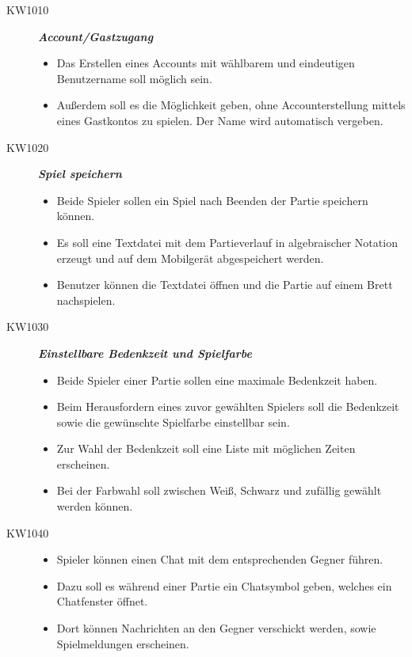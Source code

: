 \documentclass[parskip=full]{scrartcl}
\begin{document}
\begin{description}

	\item[KW1010] \textbf{\textit{Account/Gastzugang}}
	\begin{itemize}
		\item Das Erstellen eines Accounts mit wählbarem und eindeutigen Benutzername soll 		möglich sein.
		\item Außerdem soll es die Möglichkeit geben, ohne Accounterstellung mittels eines 		Gastkontos zu spielen. Der Name wird automatisch vergeben.		
	\end{itemize}
	
	\item[KW1020] \textbf{\textit{Spiel speichern}}
	\begin{itemize}
		\item Beide Spieler sollen ein Spiel nach Beenden der Partie speichern können.
		\item Es soll eine Textdatei mit dem Partieverlauf in algebraischer \gls{Notation} erzeugt und auf dem Mobilgerät abgespeichert werden.
		\item Benutzer können die Textdatei öffnen und die Partie auf einem Brett nachspielen.
	\end{itemize}
	
	\item[KW1030] \textbf{\textit{Einstellbare Bedenkzeit und Spielfarbe}}
	\begin{itemize}
		\item Beide Spieler einer Partie sollen eine maximale \gls{Bedenkzeit} haben.
		\item Beim Herausfordern eines zuvor gewählten Spielers soll die \gls{Bedenkzeit} sowie die gewünschte Spielfarbe einstellbar sein.
		\item Zur Wahl der \gls{Bedenkzeit} soll eine Liste mit möglichen Zeiten erscheinen.
		\item Bei der Farbwahl soll zwischen Weiß, Schwarz und zufällig gewählt werden können.
	\end{itemize}
	
	\item[KW1040] 
	\begin{itemize} \textbf{\textit{Chat}}
		\item \gls{Spieler} können einen Chat mit dem entsprechenden Gegner führen.
		\item Dazu soll es während einer Partie ein Chatsymbol geben, welches ein Chatfenster öffnet.
		\item Dort können Nachrichten an den Gegner verschickt werden, sowie Spielmeldungen erscheinen.
	\end{itemize}
	

\end{description}
\end{document}
